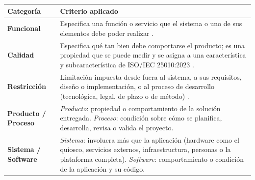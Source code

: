 \documentclass[11pt,a4paper]{article}
\newcommand{\cab}{\rowcolor{gray!18}}
\begin{document}
\small
\begin{tabularx}{\textwidth}{@{}>{\bfseries}p{2.7cm}Y@{}}
\toprule
\cab Categoría & Criterio aplicado \\
\midrule
Funcional & Especifica una función o servicio que el sistema o uno de sus elementos debe poder realizar \cite{iso29148}.\\
Calidad & Especifica qué tan bien debe comportarse el producto; es una propiedad que se puede medir y se asigna a una característica y subcaracterística de ISO/IEC 25010:2023 \cite{iso25010}.\\
Restricción & Limitación impuesta desde fuera al sistema, a sus requisitos, diseño o implementación, o al proceso de desarrollo (tecnológica, legal, de plazo o de método) \cite{iso29148}.\\
Producto / Proceso & \emph{Producto}: propiedad o comportamiento de la solución entregada. \emph{Proceso}: condición sobre cómo se planifica, desarrolla, revisa o valida el proyecto.\\
Sistema / Software & \emph{Sistema}: involucra más que la aplicación (hardware como el quiosco, servicios externos, infraestructura, personas o la plataforma completa). \emph{Software}: comportamiento o condición de la aplicación y su código.\\
\bottomrule
\end{tabularx}
\normalsize

\end{document}
